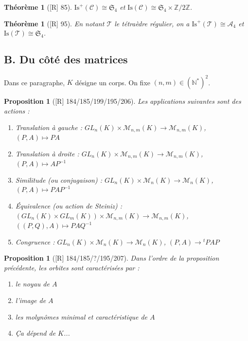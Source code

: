 \documentclass[10pt, a4paper, parskip=full, twoside, twocolumn]{report}
\newtheorem{theorem}[definition]{Théorème}
\newtheorem{proposition}[definition]{Proposition}
\newcommand{\IN}{\mathbb{N}}
\newcommand{\IZ}{\mathbb{Z}}
\newcommand{\M}{\mathcal{M}}
\begin{document}
\begin{tcolorbox}[
    breakable, %
    colback=developpement, %
    colframe=gray!0!black, %
    boxrule=0pt, %
    arc=1mm, %
	boxsep=0pt,
	left=0pt, right=0pt, top=0pt, bottom=0pt
]
\begin{theorem}[\textnormal{[R] 85}]
	\label{dev1}
	$\text{Is}^+(\mathcal{C})\cong \mathfrak{S}_4$ et $\text{Is}(\mathcal{C})\cong \mathfrak{S}_4\times \IZ/2\IZ$.
\end{theorem}
\end{tcolorbox}

\begin{theorem}[\textnormal{[R] 95}]
	En notant $\mathcal{T}$ le tétraèdre régulier, on a $\text{Is}^+(\mathcal{T})\cong \mathcal{A}_4$ et $\text{Is}(\mathcal{T})\cong \mathfrak{S}_4$.
\end{theorem}

\subsection*{B. Du côté des matrices}
Dans ce paragraphe, $K$ désigne un corps. On fixe $(n,m)\in \left(\IN^*\right)^2$.

\begin{proposition}[\textnormal{[R] 184/185/199/195/206}]
	Les applications suivantes sont des actions :
	\begin{enumerate}
		\item Translation à gauche : $GL_n(K)\times \M_{n,m}(K)\to\M_{n,m}(K)$, $(P,A)\mapsto PA$
		\item Translation à droite : $GL_n(K)\times \M_{n,m}(K)\to\M_{n,m}(K)$, $(P,A)\mapsto AP^{-1}$
		\item Similitude (ou conjugaison) : $GL_n(K)\times \M_{n}(K)\to\M_{n}(K)$, $(P,A)\mapsto PAP^{-1}$
		\item Équivalence (ou \emph{action de Steiniz}) : $\left(GL_n(K)\times GL_m(K)\right)\times \M_{n,m}(K)\to\M_{n,m}(K)$, $\left(\left(P, Q\right), A\right) \mapsto PAQ^{-1}$
		\item Congruence : $GL_n(K)\times \M_{n}(K)\to\M_{n}(K)$, $(P,A)\to {}^tPAP$
	\end{enumerate}
\end{proposition}

\begin{proposition}[\textnormal{[R] 184/185/?/195/207}]
	Dans l'ordre de la proposition précédente, les orbites sont caractérisées par :
	\begin{enumerate}
		\item le noyau de $A$
		\item l'image de $A$
		\item les molynômes minimal et caractéristique de $A$
		\item Ça dépend de $K$...
	\end{enumerate}
\end{proposition}
\end{document}
